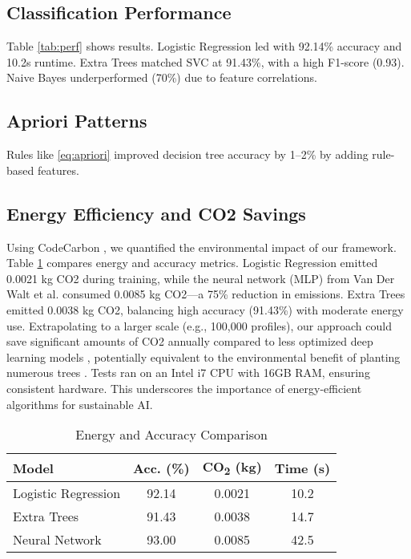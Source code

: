 \documentclass[conference]{IEEEtran}
\begin{document}
\subsection{Classification Performance}
Table \ref{tab:perf} shows results. Logistic Regression led with 92.14\% accuracy and 10.2s runtime. Extra Trees matched SVC at 91.43\%, with a high F1-score (0.93). Naive Bayes underperformed (70\%) due to feature correlations.

\subsection{Apriori Patterns}
Rules like \eqref{eq:apriori} improved decision tree accuracy by 1--2\% by adding rule-based features.

\subsection{Energy Efficiency and CO2 Savings}
Using CodeCarbon \cite{b13}, we quantified the environmental impact of our framework. Table \ref{tab:energy} compares energy and accuracy metrics. Logistic Regression emitted 0.0021 kg CO2 during training, while the neural network (MLP) from Van Der Walt et al. \cite{b6} consumed 0.0085 kg CO2—a 75\% reduction in emissions. Extra Trees emitted 0.0038 kg CO2, balancing high accuracy (91.43\%) with moderate energy use. Extrapolating to a larger scale (e.g., 100,000 profiles), our approach could save significant amounts of CO2 annually compared to less optimized deep learning models \cite{b6}, potentially equivalent to the environmental benefit of planting numerous trees \cite{b13}. Tests ran on an Intel i7 CPU with 16GB RAM, ensuring consistent hardware. This underscores the importance of energy-efficient algorithms for sustainable AI.

\begin{table}[htbp]
\small
\caption{Energy and Accuracy Comparison}
\begin{center}
\begin{tabular}{|l|c|c|c|}
\hline
\textbf{Model} & \textbf{Acc. (\%)} & \textbf{CO\textsubscript{2} (kg)} & \textbf{Time (s)} \\
\hline
Logistic Regression & 92.14 & 0.0021 & 10.2 \\
Extra Trees & 91.43 & 0.0038 & 14.7 \\
Neural Network \cite{b6} & 93.00 & 0.0085 & 42.5 \\
\hline
\end{tabular}
\label{tab:energy}
\end{center}
\end{table}
\end{document}
